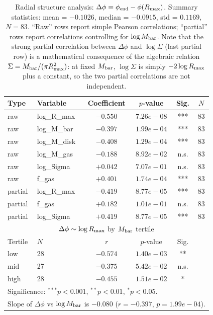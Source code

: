 \begin{table}[htbp]
\centering
\caption{Radial structure analysis: $\Delta\phi \equiv \phi_{\rm end} - \phi(R_{\rm max})$.
         Summary statistics: mean = $-0.1026$, median = $-0.0915$,
         std = $0.1169$, $N = 83$.
         ``Raw'' rows report simple Pearson correlations; ``partial'' rows report
         correlations controlling for $\log M_{\rm bar}$.
         Note that the strong partial correlation between $\Delta\phi$ and
         $\log\Sigma$ (last partial row) is a mathematical consequence of the
         algebraic relation $\Sigma = M_{\rm bar}/(\pi R_{\rm max}^2)$:
         at fixed $M_{\rm bar}$, $\log\Sigma$ is simply $-2\log R_{\rm max}$
         plus a constant, so the two partial correlations are not independent.}
\label{tab:radial_structure}
\begin{tabular}{llcccc}
\hline
Type & Variable & Coefficient & $p$-value & Sig. & $N$ \\
\hline
raw & log\_R\_max & $-0.550$ & $7.26e-08$ & *** & 83 \\
raw & log\_M\_bar & $-0.397$ & $1.99e-04$ & *** & 83 \\
raw & log\_M\_disk & $-0.408$ & $1.29e-04$ & *** & 83 \\
raw & log\_M\_gas & $-0.188$ & $8.92e-02$ & n.s. & 83 \\
raw & log\_Sigma & $+0.042$ & $7.07e-01$ & n.s. & 83 \\
raw & f\_gas & $+0.401$ & $1.74e-04$ & *** & 83 \\
partial & log\_R\_max & $-0.419$ & $8.77e-05$ & *** & 83 \\
partial & f\_gas & $+0.182$ & $1.01e-01$ & n.s. & 83 \\
partial & log\_Sigma & $+0.419$ & $8.77e-05$ & *** & 83 \\
\hline
\multicolumn{6}{c}{$\Delta\phi \sim \log R_{\rm max}$ by $M_{\rm bar}$ tertile} \\
\hline
Tertile & $N$ & $r$ & $p$-value & Sig. & \\
\hline
low & 28 & $-0.574$ & $1.40e-03$ & ** & \\
mid & 27 & $-0.375$ & $5.42e-02$ & n.s. & \\
high & 28 & $-0.455$ & $1.51e-02$ & * & \\
\hline
\multicolumn{6}{l}{\footnotesize Significance: $^{***}p<0.001$, $^{**}p<0.01$, $^{*}p<0.05$.} \\
\multicolumn{6}{l}{\footnotesize Slope of $\Delta\phi$ vs $\log M_{\rm bar}$ is $-0.080$ ($r=-0.397$, $p=1.99e-04$).} \\
\end{tabular}
\end{table}
